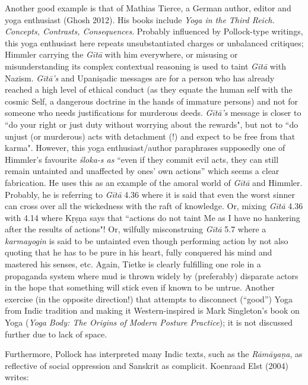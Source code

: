 Another good example is that of Mathias Tierce, a German author, editor and yoga enthusiast (Ghosh 2012). His books include {\sl Yoga in the Third Reich. Concepts, Contrasts, Consequences}. Probably influenced by Pollock-type writings, this yoga enthusiast here repeats unsubstantiated charges or unbalanced critiques; Himmler carrying the {\sl Gītā} with him everywhere, or misusing or misunderstanding its complex contextual reasoning is used to taint {\sl Gītā} with Nazism. {\sl Gītā's} and Upaniṣadic messages are for a person who has already reached a high level of ethical conduct (as they equate the human self with the cosmic Self, a dangerous doctrine in the hands of immature persons) and not for someone who needs justifications for murderous deeds. {\sl Gītā's} message is closer to ``do your right or just duty without worrying about the rewards", but not to ``do unjust (or murderous) acts with detachment (!) and expect to be free from that karma". However, this yoga enthusiast/author paraphrases supposedly one of Himmler's favourite {\sl śloka-s as} ``even if they commit evil acts, they can still remain untainted and unaffected by ones' own actions” which seems a clear fabrication. He uses this as an example of the amoral world of {\sl Gītā} and Himmler. Probably, he is referring to {\sl Gītā} 4.36 where it is said that even the worst sinner can cross over all the wickedness with the raft of knowledge. Or, mixing {\sl Gītā} 4.36 with 4.14 where Kṛṣṇa says that ``actions do not taint Me as I have no hankering after the results of actions"! Or, wilfully misconstruing {\sl Gītā} 5.7 where a {\sl karmayogin} is said to be untainted even though performing action by not also quoting that he has to be pure in his heart, fully conquered his mind and mastered his senses, etc. Again, Tietke is clearly fulfilling one role in a propaganda system where mud is thrown widely by (preferably) disparate actors in the hope that something will stick even if known to be untrue. Another exercise (in the opposite direction!) that attempts to disconnect (“good”) Yoga from Indic tradition and making it Western-inspired is Mark Singleton’s book on Yoga ({\sl Yoga Body: The Origins of Modern Posture Practice}); it is not discussed further due to lack of space.

Furthermore, Pollock has interpreted many Indic texts, such as the {\sl Rāmāyaṇa}, as reflective of social oppression and Sanskrit as complicit. Koenraad Elst (2004) writes: 
\smallskip

